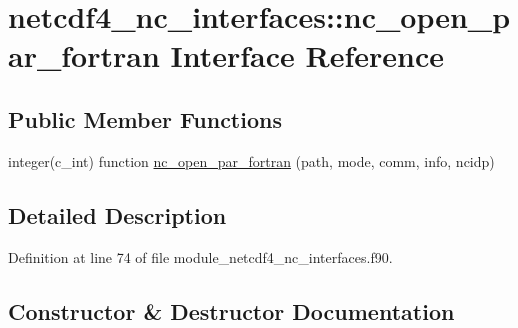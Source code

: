 \hypertarget{interfacenetcdf4__nc__interfaces_1_1nc__open__par__fortran}{}\section{netcdf4\+\_\+nc\+\_\+interfaces\+:\+:nc\+\_\+open\+\_\+par\+\_\+fortran Interface Reference}
\label{interfacenetcdf4__nc__interfaces_1_1nc__open__par__fortran}
\subsection*{Public Member Functions}
\begin{DoxyCompactItemize}
\item 
integer(c\+\_\+int) function \hyperlink{interfacenetcdf4__nc__interfaces_1_1nc__open__par__fortran_aac99b68e2d79db09056332fed6d5c453}{nc\+\_\+open\+\_\+par\+\_\+fortran} (path, mode, comm, info, ncidp)
\end{DoxyCompactItemize}


\subsection{Detailed Description}


Definition at line 74 of file module\+\_\+netcdf4\+\_\+nc\+\_\+interfaces.\+f90.



\subsection{Constructor \& Destructor Documentation}
\mbox{\label{interfacenetcdf4__nc__interfaces_1_1nc__open__par__fortran_aac99b68e2d79db09056332fed6d5c453}} 
